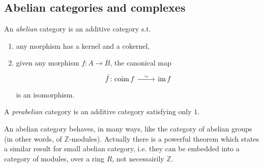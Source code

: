 \documentclass[../Main]{subfiles}
\begin{document}
\subsection{Abelian categories and complexes}
\begin{defn}
An {\em abelian} category is an additive category s.t.
	\begin{enumerate}
		\item any morphism has a kernel and a cokernel,
		\item given any morphism $f\colon A \to B$, the canonical map
			\begin{equation}
				\begin{tikzcd}
				\bar{f}\colon \mathrm{coim}\, f \arrow[r, "\sim", rightarrow] &
				\ima f
				\end{tikzcd}
			\end{equation} 
			is an isomorphism.
	\end{enumerate}
	A {\em preabelian} category is an additive category satisfying only $1$.
\end{defn}

\begin{rem}[]
	An abelian category behaves, in many ways, like the category of abelian groups
	(in other words, of $\mathbb{Z}$-modules).
	Actually there is a powerful theorem which states a similar result for small
	abelian category, i.e. they can be embedded into a category of modules, over
	a ring $R$, not necessairily $\mathbb{Z}$.
\end{rem}
\end{document}
